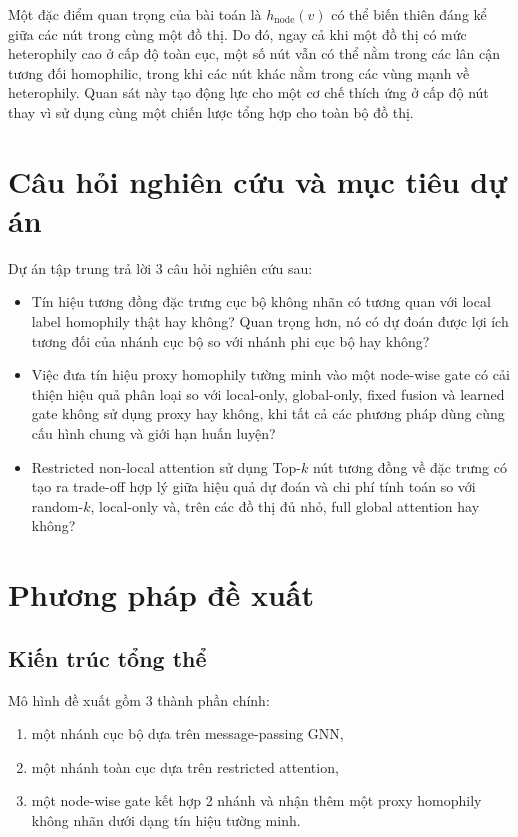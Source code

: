 \documentclass[12pt,a4paper]{article}
\numberwithin{equation}{section}
\theoremstyle{definition}
\begin{document}
Một đặc điểm quan trọng của bài toán là $h_{\text{node}}(v)$ có thể biến thiên đáng kể giữa các nút trong cùng một đồ thị. Do đó, ngay cả khi một đồ thị có mức heterophily cao ở cấp độ toàn cục, một số nút vẫn có thể nằm trong các lân cận tương đối homophilic, trong khi các nút khác nằm trong các vùng mạnh về heterophily. Quan sát này tạo động lực cho một cơ chế thích ứng ở cấp độ nút thay vì sử dụng cùng một chiến lược tổng hợp cho toàn bộ đồ thị.

\section{Câu hỏi nghiên cứu và mục tiêu dự án}
Dự án tập trung trả lời 3 câu hỏi nghiên cứu sau:
\begin{itemize}
    \item Tín hiệu tương đồng đặc trưng cục bộ không nhãn có tương quan với local label homophily thật hay không? Quan trọng hơn, nó có dự đoán được lợi ích tương đối của nhánh cục bộ so với nhánh phi cục bộ hay không?
    \item Việc đưa tín hiệu proxy homophily tường minh vào một node-wise gate có cải thiện hiệu quả phân loại so với local-only, global-only, fixed fusion và learned gate không sử dụng proxy hay không, khi tất cả các phương pháp dùng cùng cấu hình chung và giới hạn huấn luyện?
    \item Restricted non-local attention sử dụng Top-$k$ nút tương đồng về đặc trưng có tạo ra trade-off hợp lý giữa hiệu quả dự đoán và chi phí tính toán so với random-$k$, local-only và, trên các đồ thị đủ nhỏ, full global attention hay không?
\end{itemize}

\section{Phương pháp đề xuất}

\subsection{Kiến trúc tổng thể}
Mô hình đề xuất gồm 3 thành phần chính:
\begin{enumerate}
    \item[(i)] một nhánh cục bộ dựa trên message-passing GNN,
    \item[(ii)] một nhánh toàn cục dựa trên restricted attention,
    \item[(iii)] một node-wise gate kết hợp 2 nhánh và nhận thêm một proxy homophily không nhãn dưới dạng tín hiệu tường minh.
\end{enumerate}
\end{document}
